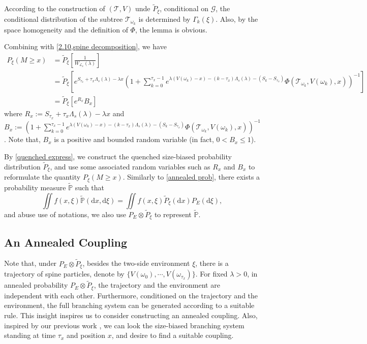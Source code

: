 \documentclass[]{article}
\makeatletter
\numberwithin{equation}{section}
\renewenvironment{proof}[1][\proofname]{%
	\par\pushQED{\qed}\normalfont%
	\topsep6\p@\@plus6\p@\relax
	\trivlist\item[\hskip\labelsep\bfseries#1\@addpunct{.}]%
	\ignorespaces
}{%
	\popQED\endtrivlist\@endpefalse
}
\theoremstyle{thmstyleone}%
\theoremstyle{thmstyletwo}%
\theoremstyle{thmstylethree}%
\theoremstyle{thmstylefour}%
\theoremstyle{thmstylefive}%
\theoremstyle{thmstylesix}%
\renewcommand{\d}{\mathrm{d}}
\renewcommand{\P}{\mathbb{P}}
\makeatother
\begin{document}
	\begin{proof}[Proof of \Cref{Lemma of spine decomposition}]
		According to the construction of $(\mathcal{T},V)$ unde $\tilde{P}_\xi$, conditional on $\mathcal{G}$, the conditional distribution of the subtree $\mathcal{T}_{\omega_k}$ is determined by $\Gamma_k(\xi)$. Also, by the space homogeneity and the definition of $\Phi$, the lemma is obvious.
	\end{proof}
	
	Combining with \cref{2.10,spine decomposition}, we have
	\begin{align}
		P_\xi(M\geqslant x)
		&=
		\tilde{P}_\xi\left[\frac{1}{W_{\mathcal{L}_x}(\lambda)}\right]
		\nonumber\\
		&=
		\tilde{P}_\xi\left[e^{S_{\tau_x}+\tau_x\Lambda_s(\lambda)-\lambda x}\left(1+\sum_{k=0}^{\tau_x-1} e^{\lambda (V(\omega_k)-x)- (k-\tau_x)\Lambda_s(\lambda)-(S_{k}-S_{\tau_x})}
		\Phi(\mathcal{T}_{\omega_k},V(\omega_k),x) \right)^{-1} \right]
		\nonumber\\
		&=
		\tilde{P}_\xi\left[ e^{R_x} B_x \right]\label{quenched express}
	\end{align}
	where $R_x:= S_{\tau_x}+\tau_x\Lambda_s(\lambda)-\lambda x $ and
	$B_x:= \left(1+\sum\limits_{k=0}^{\tau_x-1} e^{\lambda (V(\omega_k)-x)- (k-\tau_x)\Lambda_s(\lambda)-(S_{k}-S_{\tau_x})}
	\Phi(\mathcal{T}_{\omega_k},V(\omega_k),x) \right)^{-1} $. Note that,  $B_x$ is a positive and bounded random variable (in fact, $0<B_x\leqslant1$).
	
	By \cref{quenched express}, we construct the quenched size-biased probability distribution $\tilde{P}_\xi$, and use some associated random variables such as $R_x$ and $B_x$ to reformulate the quantity $P_\xi(M\geqslant x)$. Similarly to \cref{annealed prob}, there exists a probability measure $\tilde{\P}$ such that
	\begin{equation}
		\iint f(x,\xi) \tilde{\P}(\d x, \d \xi) = \iint f(x,\xi) \tilde{P}_\xi(\d x)P_E(\d \xi),
	\end{equation}
	and abuse use of notations, we also use $P_E\otimes \tilde{P}_\xi$ to represent $\tilde{\P}$.
	
	
	\subsection{An Annealed Coupling}\label{Section2.3}
	
	Note that, under $P_E\otimes \tilde{P}_\xi$, besides the two-side environment $\xi$, there is a trajectory of spine particles, denote by $\{V(\omega_0),\cdots,V(\omega_{\tau_x})\}$. For fixed $\lambda>0$, in annealed probability $P_E\otimes \tilde{P}_\xi$,  the trajectory and the environment are independent with each other. Furthermore, conditioned on the trajectory and the environment, the full branching system can be generated according to a suitable rule. This insight inspires us to consider constructing an annealed coupling. Also, inspired by our previous work \cite{Fu2025}, we can look the size-biased branching system standing at time $\tau_x$ and position $x$, and desire to find a suitable coupling.
	
\end{document}
